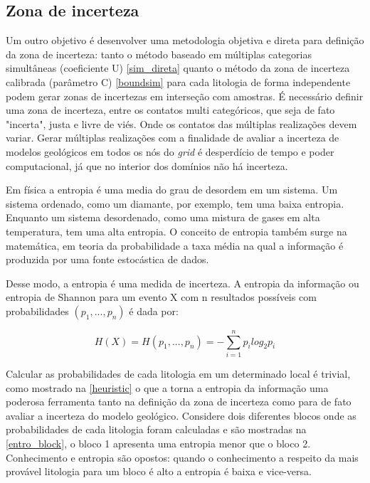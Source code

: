 \subsection{Zona de incerteza}

Um outro objetivo é desenvolver uma metodologia objetiva e direta para definição da zona de incerteza: tanto o método baseado em múltiplas categorias simultâneas (coeficiente U) \autoref{sim_direta} quanto o método da zona de incerteza calibrada (parâmetro C) \autoref{boundsim} para cada litologia de forma independente podem gerar zonas de incertezas em interseção com amostras. É necessário definir uma zona de incerteza, entre os contatos multi categóricos, que seja de fato "incerta", justa e livre de viés. Onde os contatos das múltiplas realizações devem variar. Gerar múltiplas realizações com a finalidade de avaliar a incerteza de modelos geológicos em todos os nós do \textit{grid} é desperdício de tempo e poder computacional, já que no interior dos domínios não há incerteza.

Em física a entropia é uma media do grau de desordem em um sistema. Um sistema ordenado, como um diamante, por exemplo, tem uma baixa entropia. Enquanto um sistema desordenado, como uma mistura de gases em alta temperatura, tem uma alta entropia. O conceito de entropia também surge na matemática, em teoria da probabilidade a taxa média na qual a informação é produzida por uma fonte estocástica de dados.

Desse modo, a entropia é uma medida de incerteza. A entropia da informação ou entropia de Shannon \cite{shannon1948mathematical} para um evento X com n resultados possíveis com probabilidades $(p_1, ..., p_n)$ é dada por:

\begin{equation}
    H(X)=H(p_1, ..., p_n)=-\sum^n_{i=1}p_ilog_2p_i
\end{equation}

Calcular as probabilidades de cada litologia em um determinado local é trivial, como mostrado na \autoref{heuristic} o que a torna a entropia da informação uma poderosa ferramenta tanto na definição da zona de incerteza como para de fato avaliar a incerteza do modelo geológico. Considere dois diferentes blocos onde as probabilidades de cada litologia foram calculadas e são mostradas na \autoref{entro_block}, o bloco 1 apresenta uma entropia menor que o bloco 2. Conhecimento e entropia são opostos: quando o conhecimento a respeito da mais provável litologia para um bloco é alto a entropia é baixa e vice-versa. 

